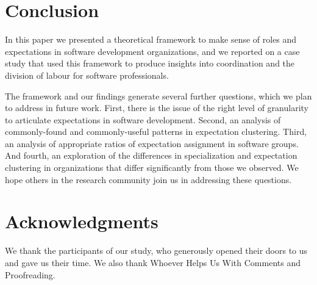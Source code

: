 \documentclass[10pt, conference, compsocconf]{IEEEtran}
\begin{document}

\section{Conclusion}

In this paper we presented a theoretical framework to make sense of roles and expectations in software development organizations, and we reported on a case study that used this framework to produce insights into coordination and the division of labour for software professionals.

The framework and our findings generate several further questions, which we plan to address in future work. First, there is the issue of the right level of granularity to articulate expectations in software development. Second, an analysis of commonly-found and commonly-useful patterns in expectation clustering. Third, an analysis of  appropriate ratios of expectation assignment in software groups. And fourth, an exploration of the differences in specialization and expectation clustering in organizations that differ significantly from those we observed. We hope others in the research community join us in addressing these questions.




\section*{Acknowledgments}

We thank the participants of our study, who generously opened their doors to us and gave us their time. We also thank Whoever Helps Us With Comments and Proofreading.



\end{document}
